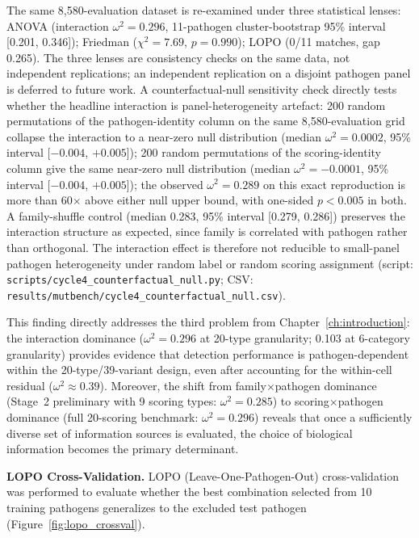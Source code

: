 The same 8{,}580-evaluation dataset is re-examined under three statistical lenses: ANOVA (interaction $\omega^2 = 0.296$, 11-pathogen cluster-bootstrap 95\% interval [0.201, 0.346]); Friedman ($\chi^2 = 7.69$, $p = 0.990$); LOPO (0/11 matches, gap 0.265). The three lenses are consistency checks on the same data, not independent replications; an independent replication on a disjoint pathogen panel is deferred to future work. A counterfactual-null sensitivity check directly tests whether the headline interaction is panel-heterogeneity artefact: 200 random permutations of the pathogen-identity column on the same 8{,}580-evaluation grid collapse the interaction to a near-zero null distribution (median $\omega^2 = 0.0002$, 95\% interval [$-0.004$, $+0.005$]); 200 random permutations of the scoring-identity column give the same near-zero null distribution (median $\omega^2 = -0.0001$, 95\% interval [$-0.004$, $+0.005$]); the observed $\omega^2 = 0.289$ on this exact reproduction is more than 60$\times$ above either null upper bound, with one-sided $p < 0.005$ in both. A family-shuffle control (median 0.283, 95\% interval [0.279, 0.286]) preserves the interaction structure as expected, since family is correlated with pathogen rather than orthogonal. The interaction effect is therefore not reducible to small-panel pathogen heterogeneity under random label or random scoring assignment (script: \texttt{scripts/cycle4\_counterfactual\_null.py}; CSV: \texttt{results/mutbench/cycle4\_counterfactual\_null.csv}).

This finding directly addresses the third problem from Chapter~\ref{ch:introduction}: the interaction dominance ($\omega^2 = 0.296$ at 20-type granularity; 0.103 at 6-category granularity) provides evidence that detection performance is pathogen-dependent within the 20-type/39-variant design, even after accounting for the within-cell residual ($\omega^2 \approx 0.39$). Moreover, the shift from family$\times$pathogen dominance (Stage~2 preliminary with 9 scoring types: $\omega^2 = 0.285$) to scoring$\times$pathogen dominance (full 20-scoring benchmark: $\omega^2 = 0.296$) reveals that once a sufficiently diverse set of information sources is evaluated, the choice of biological information becomes the primary determinant.

\textbf{LOPO Cross-Validation.}
\label{subsec:9pathogen_lopo}
LOPO (Leave-One-Pathogen-Out) cross-validation was performed to evaluate whether the best combination selected from 10 training pathogens generalizes to the excluded test pathogen (Figure~\ref{fig:lopo_crossval}).

